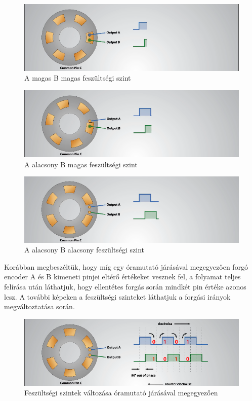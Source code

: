 \documentclass[
]{thesis-ekf}
\theoremstyle{definition}
\theoremstyle{remark}
\begin{document}
			\begin{figure}[h]
			\centering
			\includegraphics[scale=0.50]{./images/secondenc}
			\caption{A magas B magas feszültségi szint\cite{youtubeenc}}
			\label{fig:second}
			\end{figure}
			\begin{figure}[h]
				\centering
				\includegraphics[scale=0.50]{./images/thirdenc}
				\caption{A alacsony B magas feszültségi szint\cite{youtubeenc}}
				\label{fig:third}
			\end{figure}
			\begin{figure}[h]
				\centering
				\includegraphics[scale=0.50]{./images/forthenc}
				\caption{A alacsony B alacsony feszültségi szint\cite{youtubeenc}}
				\label{fig:forth}
			\end{figure}
			\par Korábban megbeszéltük, hogy míg egy óramutató járásával megegyezően forgó encoder A és B kimeneti pinjei eltérő értékeket vesznek fel, a folyamat teljes felírása után láthatjuk, hogy ellentétes forgás során mindkét pin értéke azonos lesz. A további képeken a feszültségi szinteket láthatjuk a forgási irányok megváltoztatása során.
			\begin{figure}[h]
				\centering
				\includegraphics[scale=0.50]{./images/fullenc}
				\caption{Feszültségi szintek változása óramutató járásával megegyezően\cite{youtubeenc}}
				\label{fig:fullenc}
			\end{figure}
\end{document}
